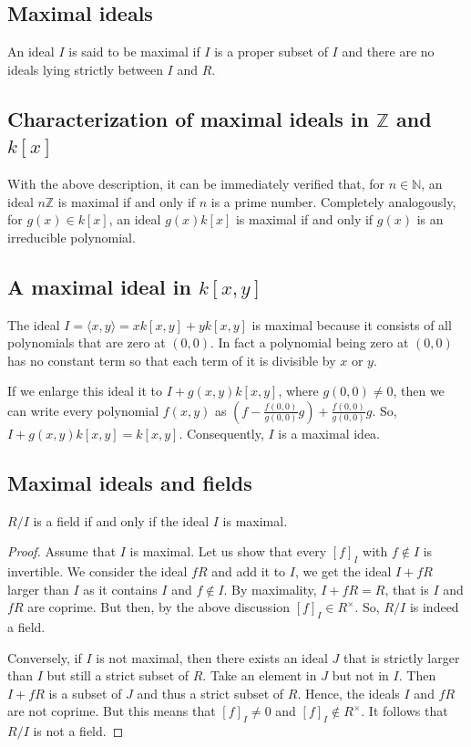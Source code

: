 \documentclass[11pt,a4paper]{amsart}
\newcommand{\Z}{{\mathbb{Z}}}
\newcommand{\N}{{\mathbb{N}}}
\begin{document}
\subsection{Maximal ideals} An ideal $I$ is said to be maximal if $I$ is a proper subset of $I$ and there are no ideals lying strictly between $I$ and $R$. 

\subsection{Characterization of maximal ideals in $\Z$ and $k[x]$} 

With the above description, it can be immediately verified that, for $n \in \N$, an ideal $n \Z$ is maximal if and only if $n$ is a prime number. Completely analogously, for $g(x) \in k[x]$, an ideal $g(x) k[x]$ is maximal if and only if $g(x)$ is an irreducible polynomial. 

\subsection{A maximal ideal in $k[x,y]$}
 The ideal $I = \langle x, y\rangle = x k[x,y] + y k[x,y]$ is maximal because it consists of all polynomials that are zero at $(0,0)$. In fact a polynomial being zero at $(0,0)$ has no constant term so that each term of it is divisible by $x$ or $y$. 
 
 If we enlarge this ideal it to  $I + g(x,y) k[x,y]$, where $g(0,0) \ne 0$, then we can write every polynomial $f(x,y)$ as $(f- \frac{f(0,0)}{g(0,0)} g) + \frac{f(0,0)}{g(0,0)} g$. So, $I + g(x,y) k[x,y] = k[x,y]$. Consequently, $I$ is a maximal idea. 
 
\subsection{Maximal ideals and fields} $R/ I$ is a field if and only if the ideal $I$ is maximal. 

\begin{proof}
	Assume that $I$ is maximal. Let us show that every $[f]_I$ with $f \not\in I$ is invertible. We consider the ideal $f R$ and  add it to $I$, we get the ideal $I + f R$ larger than $I$ as it contains $I$ and $f \not\in I$.  By maximality, $I + f R = R$, that is $I$ and $f R$ are coprime. But then, by the above discussion $[f]_I \in R^\times$. So, $R / I$ is indeed a field. 
	
	Conversely, if $I$ is not maximal, then there exists an ideal $J$ that is strictly larger than $I$ but still a strict subset of $R$. Take an element in $J$ but not in $I$. Then $I + f R$ is a subset of $J$ and thus a strict subset of $R$. Hence, the ideals $I$ and $f R$ are not coprime. But this means that $[f]_I \ne 0$ and $[f]_I \not\in R^\times$. It follows that $R / I$ is not a field. 
\end{proof} 
\end{document}
